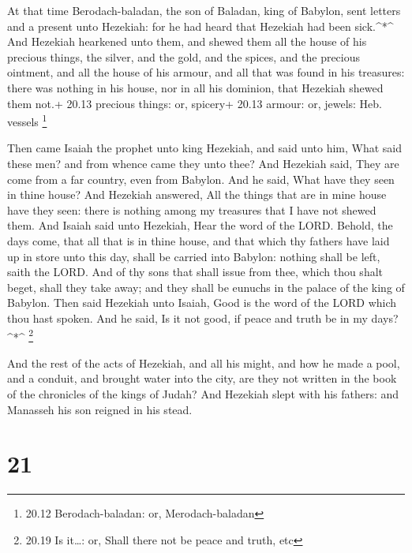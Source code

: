  At that time Berodach-baladan, the son of Baladan, king of
Babylon, sent letters and a present unto Hezekiah: for he had heard that
Hezekiah had been sick.\^{}*\^{}  And Hezekiah hearkened
unto them, and shewed them all the house of his precious things, the
silver, and the gold, and the spices, and the precious ointment, and all
the house of his armour, and all that was found in his treasures: there
was nothing in his house, nor in all his dominion, that Hezekiah shewed
them not.+ 20.13 precious things: or, spicery+ 20.13 armour: or, jewels:
Heb. vessels \footnote{20.12 Berodach-baladan: or, Merodach-baladan}

 Then came Isaiah the prophet unto king Hezekiah, and said
unto him, What said these men? and from whence came they unto thee? And
Hezekiah said, They are come from a far country, even from Babylon.
 And he said, What have they seen in thine house? And
Hezekiah answered, All the things that are in mine house have they seen:
there is nothing among my treasures that I have not shewed them.
 And Isaiah said unto Hezekiah, Hear the word of the LORD.
 Behold, the days come, that all that is in thine house,
and that which thy fathers have laid up in store unto this day, shall be
carried into Babylon: nothing shall be left, saith the LORD.
 And of thy sons that shall issue from thee, which thou
shalt beget, shall they take away; and they shall be eunuchs in the
palace of the king of Babylon.  Then said Hezekiah unto
Isaiah, Good is the word of the LORD which thou hast spoken. And he
said, Is it not good, if peace and truth be in my days?\^{}*\^{}
\footnote{20.19 Is it\ldots: or, Shall there not be peace and truth, etc}

 And the rest of the acts of Hezekiah, and all his might,
and how he made a pool, and a conduit, and brought water into the city,
are they not written in the book of the chronicles of the kings of
Judah?  And Hezekiah slept with his fathers: and Manasseh
his son reigned in his stead.

\hypertarget{section-20}{%
\section{21}\label{section-20}}

